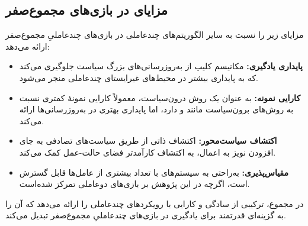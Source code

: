 \subsection{مزایای  در بازی‌های مجموع­‌صفر}

 مزایای زیر را نسبت به سایر الگوریتم‌های چند­عاملی در بازی‌های چندعاملیِ مجموع­‌صفر ارائه می‌دهد:

\begin{itemize}
    \item \textbf{پایداری یادگیری:} مکانیسم کلیپ  از به‌روزرسانی‌های بزرگ سیاست جلوگیری می‌کند که به پایداری بیشتر در محیط‌های غیرایستای چند­عاملی منجر می‌شود.
    \item \textbf{کارایی نمونه:} به عنوان یک روش درون‌سیاست،  معمولاً کارایی نمونهٔ کمتری نسبت به روش‌های برون‌سیاست مانند  و  دارد، اما پایداری بهتری در به‌روزرسانی‌ها ارائه می‌کند.
    \item \textbf{اکتشاف سیاست‌محور:} اکتشاف ذاتی از طریق سیاست‌های تصادفی به جای افزودن نویز به اعمال، به اکتشاف کارآمدتر فضای حالت-عمل کمک می‌کند.
    \item \textbf{مقیاس‌پذیری:}  به‌راحتی به سیستم‌های با تعداد بیشتری از عامل‌ها قابل گسترش است، اگرچه در این پژوهش بر بازی‌های دو­عاملی تمرکز شده‌است.
\end{itemize}

در مجموع،  ترکیبی از سادگی و کارایی  با رویکردهای چند­عاملی را ارائه می‌دهد که آن را به گزینه‌ای قدرتمند برای یادگیری در بازی‌های چندعاملیِ مجموع­‌صفر تبدیل می‌کند.
